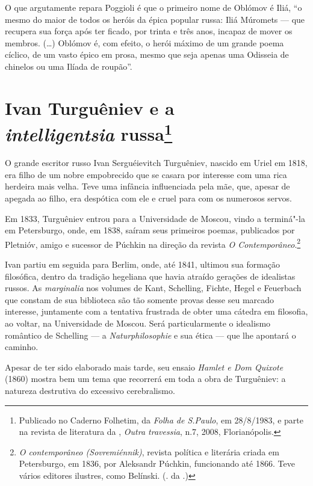 O que argutamente repara Poggioli é que o primeiro nome de Oblómov é Iliá, ``o mesmo do maior de todos os heróis da épica popular russa: Iliá Múromets --- que recupera sua força após ter ficado, por trinta e três anos, incapaz de mover os membros. (\ldots{}) Oblómov é, com efeito, o herói máximo de um grande poema cíclico, de um vasto épico em prosa, mesmo que seja apenas uma Odisseia de chinelos ou uma Ilíada de roupão''.

\chapter{Ivan Turguêniev e a\\ \emph{intelligentsia} russa\footnote{Publicado no Caderno Folhetim, da \emph{Folha de S.Paulo}, em 28/8/1983, e parte na revista de literatura da \protect{}, \emph{Outra travessia}, n.7, 2008, Florianópolis.}}
\label{turgueniev}

O grande escritor russo Ivan Serguéievitch Turguêniev, nascido
em Uriel em 1818, era filho de um nobre empobrecido que se casara
por interesse com uma rica
herdeira mais velha. Teve uma infância influenciada pela mãe, que,
apesar de apegada ao filho, era despótica com ele e cruel para com os numerosos servos.

Em 1833, Turguêniev entrou para a Universidade de Moscou, vindo a terminá"-la em
Petersburgo, onde, em 1838, saíram seus primeiros poemas, publicados por
Pletnióv, amigo e sucessor de Púchkin na direção da revista \emph{O
Contemporâneo}.\footnote{\emph{O contemporâneo (Sovremiénnik)}, revista política e literária criada em Petersburgo, em 1836, por Aleksandr Púchkin, funcionando até 1866. Teve vários editores ilustres, como Belínski. (. da .)}

Ivan partiu em seguida para Berlim, onde, até 1841, ultimou sua formação
filosófica, dentro da tradição hegeliana que havia atraído gerações de
idealistas russos. As \emph{marginalia} nos volumes de Kant, Schelling,
Fichte, Hegel e Feuerbach que constam de sua biblioteca são tão somente
provas desse seu marcado interesse, juntamente com a tentativa frustrada
de obter uma cátedra em filosofia, ao voltar, na Universidade de
Moscou. Será particularmente o idealismo romântico de Schelling --- a
\emph{Naturphilosophie} e sua ética --- que lhe apontará o caminho.

Apesar de ter sido elaborado mais tarde, seu ensaio \emph{Hamlet e Dom
Quixote} (1860) mostra bem um tema que recorrerá em toda a  obra
de Turguêniev: a natureza destrutiva do excessivo cerebralismo.

